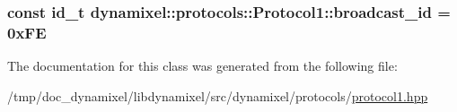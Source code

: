 \subsubsection[{broadcast\+\_\+id}]{\setlength{\rightskip}{0pt plus 5cm}const {\bf id\+\_\+t} dynamixel\+::protocols\+::\+Protocol1\+::broadcast\+\_\+id = 0x\+F\+E\hspace{0.3cm}{\ttfamily [static]}}\label{classdynamixel_1_1protocols_1_1_protocol1_ac14fd1ffbfadfccf29a923149f416de2}


The documentation for this class was generated from the following file\+:\begin{DoxyCompactItemize}
\item 
/tmp/doc\+\_\+dynamixel/libdynamixel/src/dynamixel/protocols/\hyperlink{protocol1_8hpp}{protocol1.\+hpp}\end{DoxyCompactItemize}
